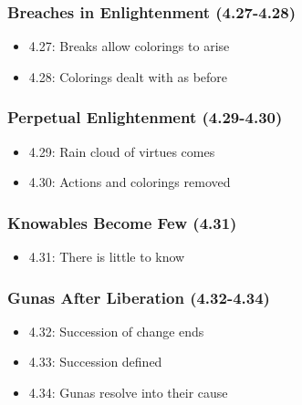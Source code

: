 \begin{frame}[fragile]\frametitle{Breaches in Enlightenment (4.27-4.28)}
\begin{itemize}
\item 4.27: Breaks allow colorings to arise
\item 4.28: Colorings dealt with as before
\end{itemize}  
\end{frame}

\begin{frame}[fragile]\frametitle{Perpetual Enlightenment (4.29-4.30)}
\begin{itemize}
\item 4.29: Rain cloud of virtues comes 
\item 4.30: Actions and colorings removed
\end{itemize}
\end{frame}

\begin{frame}[fragile]\frametitle{Knowables Become Few (4.31)}
\begin{itemize}
\item 4.31: There is little to know
\end{itemize}
\end{frame}

\begin{frame}[fragile]\frametitle{Gunas After Liberation (4.32-4.34)} 
\begin{itemize}
\item 4.32: Succession of change ends
\item 4.33: Succession defined
\item 4.34: Gunas resolve into their cause
\end{itemize}
\end{frame}

